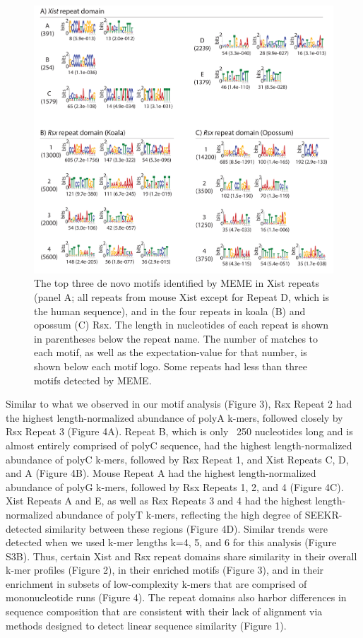 \begin{figure}[p]
\centering
\includegraphics[angle=0, width=\textwidth]{images/fig3_v3-01.pdf}
\caption{The top three de novo motifs identified by MEME in Xist repeats (panel A; all repeats from mouse Xist except for Repeat D, which is the human sequence), and in the four repeats in koala (B) and opossum (C) Rsx. The length in nucleotides of each repeat is shown in parentheses below the repeat name. The number of matches to each motif, as well as the expectation-value for that number, is shown below each motif logo. Some repeats had less than three motifs detected by MEME.}
\end{figure}
Similar to what we observed in our motif analysis (Figure 3), Rsx Repeat 2 had the highest length-normalized abundance of polyA k-mers, followed closely by Rsx Repeat 3 (Figure 4A). Repeat B, which is only ~250 nucleotides long and is almost entirely comprised of polyC sequence, had the highest length-normalized abundance of polyC k-mers, followed by Rsx Repeat 1, and Xist Repeats C, D, and A (Figure 4B). Mouse Repeat A had the highest length-normalized abundance of polyG k-mers, followed by Rsx Repeats 1, 2, and 4 (Figure 4C). Xist Repeats A and E, as well as Rsx Repeats 3 and 4 had the highest length-normalized abundance of polyT k-mers, reflecting the high degree of SEEKR-detected similarity between these regions (Figure 4D). Similar trends were detected when we used k-mer lengths k=4, 5, and 6 for this analysis (Figure S3B). Thus, certain Xist and Rsx repeat domains share similarity in their overall k-mer profiles (Figure 2), in their enriched motifs (Figure 3), and in their enrichment in subsets of low-complexity k-mers that are comprised of mononucleotide runs (Figure 4). The repeat domains also harbor differences in sequence composition that are consistent with their lack of alignment via methods designed to detect linear sequence similarity (Figure 1).


